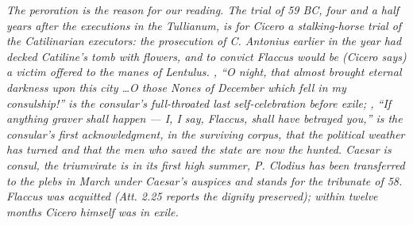 \textit{The peroration is the reason for our reading. The
trial of 59 BC, four and a half years after the executions
in the Tullianum, is for Cicero a stalking-horse trial of
the Catilinarian executors: the prosecution of C. Antonius
earlier in the year had decked Catiline's tomb with flowers,
and to convict Flaccus would be (Cicero says) a victim
offered to the manes of Lentulus. , ``O
night, that almost brought eternal darkness upon this city
\ldots O those Nones of December which fell in my
consulship!'' is the consular's full-throated last
self-celebration before exile; , ``If
anything graver shall happen --- I, I say, Flaccus, shall
have betrayed you,'' is the consular's first acknowledgment,
in the surviving corpus, that the political weather has
turned and that the men who saved the state are now the
hunted. Caesar is consul, the triumvirate is in its first
high summer, P. Clodius has been transferred to the plebs in
March under Caesar's auspices and stands for the tribunate of
58. Flaccus was acquitted (\textit{Att.} 2.25 reports the
dignity preserved); within twelve months Cicero himself was
in exile.}
